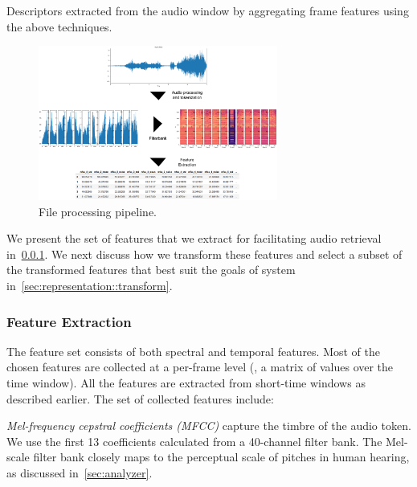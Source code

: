\begin{table}[t!]
\centering

\caption{
 Descriptors extracted from the audio window by
 aggregating frame features using the above techniques. }
\label{tab:stats}
\end{table}

\begin{figure}[t]
    \centering
    \includegraphics[width=0.7\textwidth]{figures/processing-pipeline.png}
    \caption{File processing pipeline.}
    \label{fig:my-label}
\end{figure}

We present the set of features that we extract for facilitating audio retrieval
in~\cref{sec:representation::extraction}.
%
We next discuss how we transform these features and select a subset of the
transformed features that best suit the goals of system
in~\cref{sec:representation::transform}.

\subsubsection{Feature Extraction}
\label{sec:representation::extraction}

The feature set consists of both spectral and temporal features. 
%
Most of the chosen features are collected at a per-frame level (\ie, 
a matrix of values over the time window). 
%
All the features are extracted from short-time windows as described earlier.
%
The set of collected features include:

\squishitemize

\item \textit{Mel-frequency cepstral coefficients (MFCC)} capture the timbre
of the audio token. 
%
We use the first 13 coefficients calculated from a 40-channel filter bank.
%
The Mel-scale filter bank closely maps to the perceptual scale of pitches in
human hearing, as discussed in~\cref{sec:analyzer}. 

